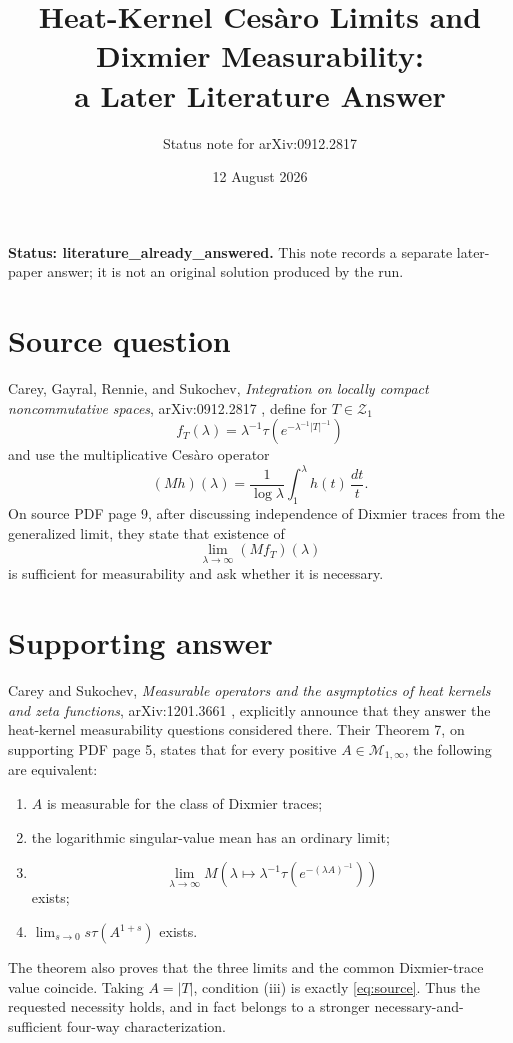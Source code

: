 \documentclass[11pt]{article}
\title{Heat-Kernel Ces\`aro Limits and Dixmier Measurability:\\
a Later Literature Answer}
\author{Status note for arXiv:0912.2817}
\date{12 August 2026}
\begin{document}
\maketitle

\noindent\textbf{Status: literature\_already\_answered.}
This note records a separate later-paper answer; it is not an original
solution produced by the run.

\section*{Source question}

Carey, Gayral, Rennie, and Sukochev,
\emph{Integration on locally compact noncommutative spaces},
arXiv:0912.2817 \cite{CGRS}, define for \(T\in\mathcal Z_1\)
\[
 f_T(\lambda)=\lambda^{-1}
 \tau\!\left(e^{-\lambda^{-1}|T|^{-1}}\right)
\]
and use the multiplicative Ces\`aro operator
\[
 (Mh)(\lambda)=\frac1{\log\lambda}\int_1^\lambda h(t)\,\frac{dt}{t}.
\]
On source PDF page 9, after discussing independence of Dixmier traces from
the generalized limit, they state that existence of
\[
                  \lim_{\lambda\to\infty}(Mf_T)(\lambda)
 \tag{1}\label{eq:source}
\]
is sufficient for measurability and ask whether it is necessary.

\section*{Supporting answer}

Carey and Sukochev,
\emph{Measurable operators and the asymptotics of heat kernels and zeta
functions}, arXiv:1201.3661 \cite{CS}, explicitly announce that they answer
the heat-kernel measurability questions considered there.  Their Theorem 7,
on supporting PDF page 5, states that for every positive
\(A\in\mathcal M_{1,\infty}\), the following are equivalent:
\begin{enumerate}
\item \(A\) is measurable for the class of Dixmier traces;
\item the logarithmic singular-value mean has an ordinary limit;
\item
\[
 \lim_{\lambda\to\infty}
 M\!\left(\lambda\longmapsto
 \lambda^{-1}\tau(e^{-(\lambda A)^{-1}})\right)
\]
exists;
\item \(\lim_{s\to0}s\tau(A^{1+s})\) exists.
\end{enumerate}
The theorem also proves that the three limits and the common Dixmier-trace
value coincide.  Taking \(A=|T|\), condition (iii) is exactly
\eqref{eq:source}.  Thus the requested necessity holds, and in fact belongs
to a stronger necessary-and-sufficient four-way characterization.
\end{document}
